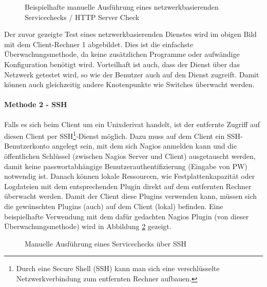 \begin{figure}[ht]  
	\centering
		\caption{Beispielhafte manuelle Ausführung eines netzwerkbasierenden Servicechecks / HTTP Server Check}
		\label{check-http}
\end{figure}

Der zuvor gezeigte Test eines netzwerkbasierenden Dienstes wird im obigen Bild mit dem Client-Rechner 1 abgebildet.
Dies ist die einfachste Überwachungsmethode, da keine zusätzlichen Programme oder aufwändige Konfiguration benötigt wird.
Vorteilhaft ist auch, dass der Dienst über das Netzwerk getestet wird, so wie der Benutzer auch auf den Dienst zugreift.
Damit können auch gleichzeitig andere Knotenpunkte wie Switches überwacht werden.

\paragraph{Methode 2 - SSH}

Falls es sich beim Client um ein Unixderivat handelt, ist der entfernte Zugriff auf diesen Client per SSH\footnote{Durch eine Secure Shell (\gls{SSH}) kann man sich eine verschlüsselte Netzwerkverbindung zum entfernten Rechner aufbauen.}-Dienst möglich.
Dazu muss auf dem Client ein \gls{SSH}-Benutzerkonto angelegt sein, mit dem sich Nagios anmelden kann und die öffentlichen Schlüssel (zwischen Nagios Server und Client) ausgetauscht werden, damit keine passwortabhängige Benutzerauthentifizierung (Eingabe von PW) notwendig ist.
Danach können lokale Ressourcen, wie Festplattenkapazität oder Logdateien mit dem entsprechenden Plugin direkt auf dem entfernten Rechner überwacht werden.
Damit der Client diese Plugins verwenden kann, müssen sich die gewünschten Plugins (auch) auf dem Client (lokal) befinden.
Eine beispielhafte Verwendung mit dem dafür gedachten Nagios Plugin  (von dieser Überwachungsmethode) wird in Abbildung \ref{check-ssh} gezeigt.

\begin{figure}[ht]
	\centering
		\caption{Manuelle Ausführung eines Servicechecks über SSH}
		\label{check-ssh}
\end{figure}

